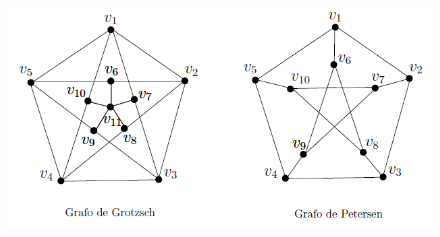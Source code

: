 \documentclass[twoside]{article}
\begin{document}
\newpage

\begin{figure}[h!]
\includegraphics[scale=0.8]{Rel1}
\end{figure}
%
%
%
%
\end{document}
